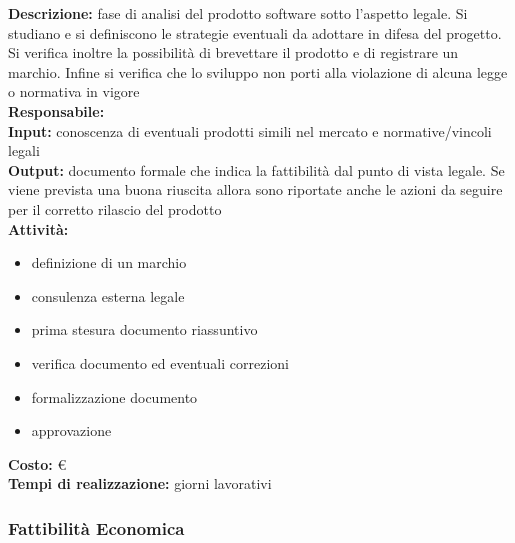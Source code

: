 \textbf{Descrizione:} fase di analisi del prodotto software sotto l'aspetto legale. Si studiano e
si definiscono le strategie eventuali da adottare in difesa del progetto. Si verifica inoltre
la possibilità di brevettare il prodotto e di registrare un marchio. Infine si verifica che
lo sviluppo non porti alla violazione di alcuna legge o normativa in vigore\\
\linebreak
\textbf{Responsabile:} \\
\linebreak
\textbf{Input:} conoscenza di eventuali prodotti simili nel mercato e normative/vincoli legali\\
\linebreak
\textbf{Output:} documento formale che indica la fattibilità dal punto di vista legale. Se viene
prevista una buona riuscita allora sono riportate anche le azioni da seguire per il corretto
rilascio del prodotto\\
\linebreak
\textbf{Attività:}
\begin{itemize}
\item definizione di un marchio
\item consulenza esterna legale
\item prima stesura documento riassuntivo
\item verifica documento ed eventuali correzioni
\item formalizzazione documento
\item approvazione
\end{itemize}
\textbf{Costo:} \euro \\
\textbf{Tempi di realizzazione:}  giorni lavorativi


\subsubsection{Fattibilità Economica}

